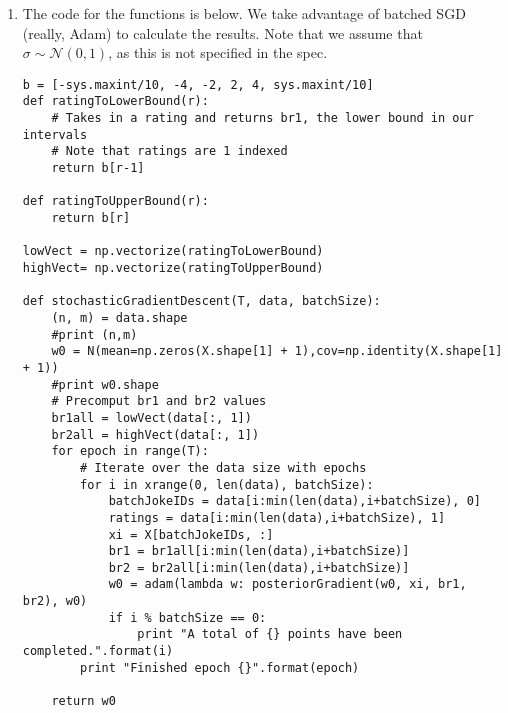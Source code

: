 \documentclass{harvardml}
\theoremstyle{plain}
\begin{document}
\begin{enumerate}
\vspace{-0.1cm}
\item The code for the functions is below. We take advantage of batched SGD (really, Adam) to calculate the results. Note that we assume that $\sigma \sim \mathcal{N}(0,1)$, as this is not specified in the spec.
\begin{verbatim}
b = [-sys.maxint/10, -4, -2, 2, 4, sys.maxint/10]
def ratingToLowerBound(r):
    # Takes in a rating and returns br1, the lower bound in our intervals
    # Note that ratings are 1 indexed
    return b[r-1]

def ratingToUpperBound(r):
    return b[r]

lowVect = np.vectorize(ratingToLowerBound)
highVect= np.vectorize(ratingToUpperBound)

def stochasticGradientDescent(T, data, batchSize):
    (n, m) = data.shape
    #print (n,m)
    w0 = N(mean=np.zeros(X.shape[1] + 1),cov=np.identity(X.shape[1] + 1))
    #print w0.shape
    # Precomput br1 and br2 values
    br1all = lowVect(data[:, 1])
    br2all = highVect(data[:, 1])
    for epoch in range(T):
        # Iterate over the data size with epochs
        for i in xrange(0, len(data), batchSize):
            batchJokeIDs = data[i:min(len(data),i+batchSize), 0]
            ratings = data[i:min(len(data),i+batchSize), 1]
            xi = X[batchJokeIDs, :]
            br1 = br1all[i:min(len(data),i+batchSize)]
            br2 = br2all[i:min(len(data),i+batchSize)]
            w0 = adam(lambda w: posteriorGradient(w0, xi, br1, br2), w0)
            if i % batchSize == 0:
                print "A total of {} points have been completed.".format(i)
        print "Finished epoch {}".format(epoch)

    return w0
\end{verbatim}


\end{enumerate}
\end{document}
